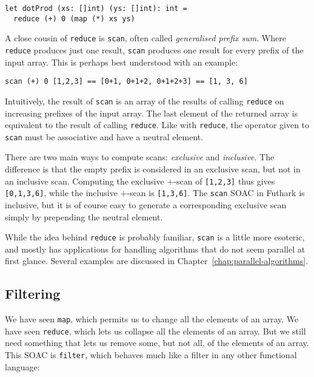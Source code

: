 \documentclass[oneside,11pt]{book}
\begin{document}
\begin{lstlisting}
let dotProd (xs: []int) (ys: []int): int =
  reduce (+) 0 (map (*) xs ys)
\end{lstlisting}

A close cousin of \texttt{reduce} is \texttt{scan}, often called
\textit{generalised prefix sum}.  Where \texttt{reduce} produces just
one result, \texttt{scan} produces one result for every prefix of the
input array.  This is perhaps best understood with an example:

\begin{lstlisting}
scan (+) 0 [1,2,3] == [0+1, 0+1+2, 0+1+2+3] == [1, 3, 6]
\end{lstlisting}

Intuitively, the result of \texttt{scan} is an array of the results of calling
\texttt{reduce} on increasing prefixes of the input array.  The last
element of the returned array is equivalent to the result of calling
\texttt{reduce}. Like with \texttt{reduce}, the operator given to
\texttt{scan} must be associative and have a neutral element.

There are two main ways to compute scans: \textit{exclusive} and
\textit{inclusive}.  The difference is that the empty prefix is
considered in an exclusive scan, but not in an inclusive scan.
Computing the exclusive $+$-scan of \texttt{[1,2,3]} thus gives
\texttt{[0,1,3,6]}, while the inclusive $+$-scan is \texttt{[1,3,6]}.
The \texttt{scan} SOAC in Futhark is inclusive, but it is of course
easy to generate a corresponding exclusive scan simply by prepending
the neutral element.

While the idea behind \texttt{reduce} is probably familiar,
\texttt{scan} is a little more esoteric, and mostly has applications
for handling algorithms that do not seem parallel at first glance.
Several examples are discussed in
Chapter~\ref{chap:parallel-algorithms}.

\subsection{Filtering}

We have seen \texttt{map}, which permits us to change all the elements
of an array.  We have seen \texttt{reduce}, which lets us collapse all
the elements of an array.  But we still need something that lets us
remove some, but not all, of the elements of an array.  This SOAC is
\texttt{filter}, which behaves much like a filter in any other
functional language:
\end{document}
